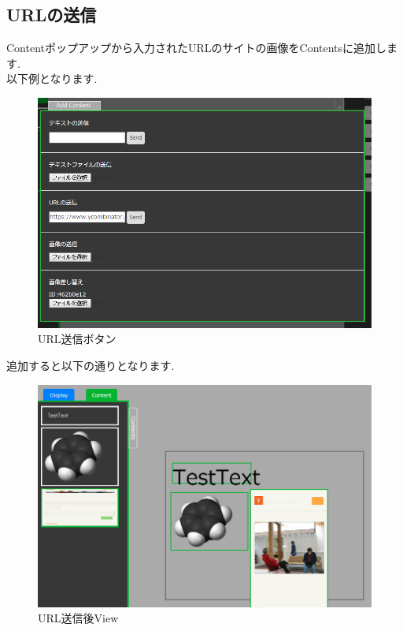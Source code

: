 \documentclass[a4paper,10pt,oneside]{jsbook}
\begin{document}
\subsection{URLの送信}
Contentポップアップから入力されたURLのサイトの画像をContentsに追加します.\\
以下例となります.\\
\begin{figure}[htbp]
	\begin{center}
		\includegraphics[width=12.5cm]{image/AddContent_URL.PNG}

	\end{center}
	\caption{URL送信ボタン}
	\label{fig:urlsend}
\end{figure}

追加すると以下の通りとなります.\\


\begin{figure}[htbp]
	\begin{center}
		\includegraphics[width=12.5cm]{image/AddContent_URL_View.PNG}
	\end{center}
	\caption{URL送信後View}
	\label{fig:sendurl}
\end{figure}
\end{document}
